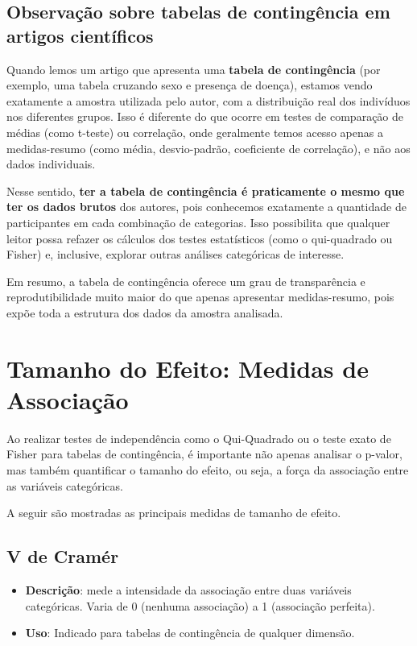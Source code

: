 \documentclass[
]{book}
\providecommand{\tightlist}{%
  \setlength{\itemsep}{0pt}\setlength{\parskip}{0pt}}
\begin{document}
\subsection{Observação sobre tabelas de contingência em artigos científicos}\label{observauxe7uxe3o-sobre-tabelas-de-continguxeancia-em-artigos-cientuxedficos}

Quando lemos um artigo que apresenta uma \textbf{tabela de contingência} (por exemplo, uma tabela cruzando sexo e presença de doença), estamos vendo exatamente a amostra utilizada pelo autor, com a distribuição real dos indivíduos nos diferentes grupos. Isso é diferente do que ocorre em testes de comparação de médias (como t-teste) ou correlação, onde geralmente temos acesso apenas a medidas-resumo (como média, desvio-padrão, coeficiente de correlação), e não aos dados individuais.

Nesse sentido, \textbf{ter a tabela de contingência é praticamente o mesmo que ter os dados brutos} dos autores, pois conhecemos exatamente a quantidade de participantes em cada combinação de categorias. Isso possibilita que qualquer leitor possa refazer os cálculos dos testes estatísticos (como o qui-quadrado ou Fisher) e, inclusive, explorar outras análises categóricas de interesse.

Em resumo, a tabela de contingência oferece um grau de transparência e reprodutibilidade muito maior do que apenas apresentar medidas-resumo, pois expõe toda a estrutura dos dados da amostra analisada.

\section{Tamanho do Efeito: Medidas de Associação}\label{tamanho-do-efeito-medidas-de-associauxe7uxe3o}

Ao realizar testes de independência como o Qui-Quadrado ou o teste exato de Fisher para tabelas de contingência, é importante não apenas analisar o p-valor, mas também quantificar o tamanho do efeito, ou seja, a força da associação entre as variáveis categóricas.

A seguir são mostradas as principais medidas de tamanho de efeito.

\subsection{V de Cramér}\label{v-de-cramuxe9r}

\begin{itemize}
\tightlist
\item
  \textbf{Descrição}: mede a intensidade da associação entre duas variáveis categóricas. Varia de 0 (nenhuma associação) a 1 (associação perfeita).
\item
  \textbf{Uso}: Indicado para tabelas de contingência de qualquer dimensão.
\end{itemize}
\end{document}
